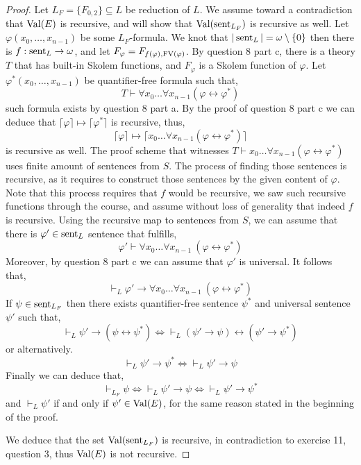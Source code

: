 \begin{proof}
	Let $L_F = \{ F_{0, 2} \} \subseteq L$ be reduction of $L$.
	We assume toward a contradiction that $\operatorname{Val}(E)$ is recursive, and will show that $\operatorname{Val}(\operatorname{sent}_{L_F})$ is recursive as well.
	Let $\varphi(x_0, \ldots, x_{n - 1})$ be some $L_F$-formula.
	We knot that $|\operatorname{sent}_L| = \omega \setminus \{ 0 \}$ then there is $f : \operatorname{sent}_L \to \omega$, and let $F_{\varphi} = F_{f(\varphi), \operatorname{FV}(\varphi)}$.
	By question 8 part c, there is a theory $T$ that has built-in Skolem functions, and $F_{\varphi}$ is a Skolem function of $\varphi$.
	Let $\varphi^*(x_0, \ldots, x_{n - 1})$ be quantifier-free formula such that,
	\[
		T \vdash \forall x_0 \ldots \forall x_{n - 1} (\varphi \leftrightarrow \varphi^*)
	\]
	such formula exists by question 8 part a.
	By the proof of question 8 part c we can deduce that $\lceil \varphi \rceil \mapsto \lceil \varphi^* \rceil$ is recursive,
	thus,
	\[
		\lceil \varphi \rceil \mapsto \lceil x_0 \ldots \forall x_{n - 1} (\varphi \leftrightarrow \varphi^*) \rceil
	\]
	is recursive as well.
	The proof scheme that witnesses $T \vdash x_0 \ldots \forall x_{n - 1} (\varphi \leftrightarrow \varphi^*)$ uses finite amount of sentences from $S$.
	The process of finding those sentences is recursive, as it requires to construct those sentences by the given content of $\varphi$.
	Note that this process requires that $f$ would be recursive, we saw such recursive functions through the course, and assume without loss of generality that indeed $f$ is recursive.
	Using the recursive map to sentences from $S$, we can assume that there is $\varphi' \in \operatorname{sent}_L$ sentence that fulfills,
	\[
		\varphi' \vdash \forall x_0 \ldots \forall x_{n - 1}\ (\varphi \leftrightarrow \varphi^*)
	\]
	Moreover, by question 8 part c we can assume that $\varphi'$ is universal.
	It follows that,
	\[
		\vdash_L \varphi' \to \forall x_0 \ldots \forall x_{n - 1}\ (\varphi \leftrightarrow \varphi^*)
	\]
	If $\psi \in \operatorname{sent}_{L_F}$ then there exists quantifier-free sentence $\psi^*$ and universal sentence $\psi'$ such that,
	\[
		\vdash_L \psi' \to (\psi \leftrightarrow \psi^*)
		\iff \vdash_L (\psi' \to \psi) \leftrightarrow (\psi' \to \psi^*)
	\]
	or alternatively.
	\[
		\vdash_L \psi' \to \psi^*
		\iff \vdash_L \psi' \to \psi
	\]
	Finally we can deduce that,
	\[
		\vdash_{L_F} \psi
		\iff \vdash_L \psi' \to \psi
		\iff \vdash_L \psi' \to \psi^*
	\]
	and $\vdash_L \psi'$ if and only if $\psi' \in \operatorname{Val}(E)$, for the same reason stated in the beginning of the proof.

	We deduce that the set $\operatorname{Val}(\operatorname{sent}_{L_F})$ is recursive, in contradiction to exercise 11, question 3, thus $\operatorname{Val}(E)$ is not recursive.
\end{proof}

